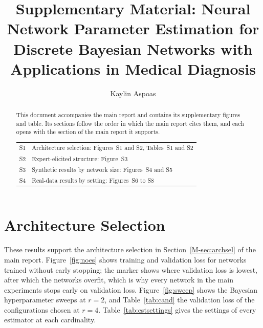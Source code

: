 \documentclass[a4paper,fleqn]{cas-sc}
\begin{document}
\let\WriteBookmarks\relax


\title [mode = title]{Supplementary Material: Neural Network Parameter Estimation for Discrete Bayesian Networks with Applications in Medical Diagnosis}

\author[1]{Kaylin Aspoas}

\begin{abstract}
This document accompanies the main report and contains its supplementary figures and table. Its sections follow the order in which the main report cites them, and each opens with the section of the main report it supports.

\begin{tabular}{@{}ll@{}}
S1 & Architecture selection: Figures~S1 and S2, Tables~S1 and S2 \\
S2 & Expert-elicited structure: Figure~S3 \\
S3 & Synthetic results by network size: Figures~S4 and S5 \\
S4 & Real-data results by setting: Figures~S6 to S8 \\
\end{tabular}
\end{abstract}

\maketitle

\section{Architecture Selection}\label{sec:s-arch}

These results support the architecture selection in Section~\ref{M-sec:archsel} of the main report. Figure~\ref{fig:noes} shows training and validation loss for networks trained without early stopping; the marker shows where validation loss is lowest, after which the networks overfit, which is why every network in the main experiments stops early on validation loss. Figure~\ref{fig:sweep} shows the Bayesian hyperparameter sweeps at $r=2$, and Table~\ref{tab:cand} the validation loss of the configurations chosen at $r=4$. Table~\ref{tab:estsettings} gives the settings of every estimator at each cardinality.
\end{document}
